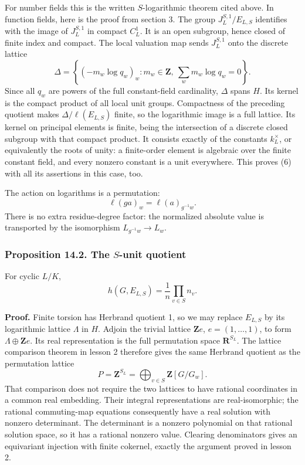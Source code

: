 \documentclass[11pt,a4paper]{article}
\begin{document}
For number fields this is the written \(S\)-logarithmic theorem cited
above. In function fields, here is the proof from section 3. The group
\(J_L^{S,1}/E_{L,S}\) identifies with the image of \(J_L^{S,1}\) in
compact \(C_L^1\). It is an open subgroup, hence closed of finite index
and compact. The local valuation map sends \(J_L^{S,1}\) onto the
discrete lattice \[
\Delta=\left\{(-m_w\log q_w)_w:m_w\in\mathbf Z,\
                            \sum_w m_w\log q_w=0\right\}.
\] Since all \(q_w\) are powers of the full constant-field cardinality,
\(\Delta\) spans \(H\). Its kernel is the compact product of all local
unit groups. Compactness of the preceding quotient makes
\(\Delta/\ell(E_{L,S})\) finite, so the logarithmic image is a full
lattice. Its kernel on principal elements is finite, being the
intersection of a discrete closed subgroup with that compact product. It
consists exactly of the constants \(k_L^\times\), or equivalently the
roots of unity: a finite-order element is algebraic over the finite
constant field, and every nonzero constant is a unit everywhere. This
proves (6) with all its assertions in this case, too.

The action on logarithms is a permutation: \[
\ell(g a)_w=\ell(a)_{g^{-1}w}.
\tag{7}
\] There is no extra residue-degree factor: the normalized absolute
value is transported by the isomorphism \(L_{g^{-1}w}\to L_w\).

\subsubsection{\texorpdfstring{Proposition 14.2. The \(S\)-unit
quotient}{Proposition 14.2. The S-unit quotient}}\label{proposition-14.2.-the-s-unit-quotient}

For cyclic \(L/K\), \[
h(G,E_{L,S})=\frac1n\prod_{v\in S}n_v.
\tag{8}
\]

\textbf{Proof.} Finite torsion has Herbrand quotient 1, so we may
replace \(E_{L,S}\) by its logarithmic lattice \(\Lambda\) in \(H\).
Adjoin the trivial lattice \(\mathbf Z e\), \(e=(1,\ldots,1)\), to form
\(\Lambda\oplus\mathbf Z e\). Its real representation is the full
permutation space \(\mathbf R^{S_L}\). The lattice comparison theorem in
lesson 2 therefore gives the same Herbrand quotient as the permutation
lattice \[
P=\mathbf Z^{S_L}
=\bigoplus_{v\in S}\mathbf Z[G/G_w].
\] That comparison does not require the two lattices to have rational
coordinates in a common real embedding. Their integral representations
are real-isomorphic; the rational commuting-map equations consequently
have a real solution with nonzero determinant. The determinant is a
nonzero polynomial on that rational solution space, so it has a rational
nonzero value. Clearing denominators gives an equivariant injection with
finite cokernel, exactly the argument proved in lesson 2.
\end{document}
